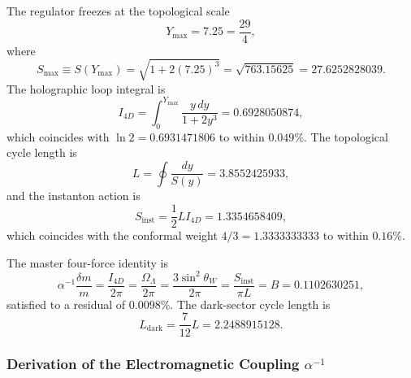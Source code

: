 \documentclass[12pt,oneside,openany]{book}
\begin{document}
The regulator freezes at the topological scale
\begin{equation}
Y_{\max} = 7.25 = \frac{29}{4},
\label{eq:Ymax}
\end{equation}
where
\begin{equation}
S_{\max} \equiv S(Y_{\max}) = \sqrt{1 + 2(7.25)^3} = \sqrt{763.15625} = 27.6252828039.
\label{eq:Smax}
\end{equation}
The holographic loop integral is
\begin{equation}
I_{4D} = \int_0^{Y_{\max}} \frac{y \, dy}{1 + 2y^3} = 0.6928050874,
\label{eq:I4D}
\end{equation}
which coincides with $\ln 2 = 0.6931471806$ to within $0.049\%$. The topological cycle length is
\begin{equation}
L = \oint \frac{dy}{S(y)} = 3.8552425933,
\label{eq:L}
\end{equation}
and the instanton action is
\begin{equation}
S_{\mathrm{inst}} = \frac{1}{2} L I_{4D} = 1.3354658409,
\label{eq:Sinst}
\end{equation}
which coincides with the conformal weight $4/3 = 1.3333333333$ to within $0.16\%$.

The master four-force identity is
\begin{equation}
\boxed{\alpha^{-1}\frac{\delta m}{m} = \frac{I_{4D}}{2\pi} = \frac{\Omega_\Lambda}{2\pi} = \frac{3\sin^2\theta_W}{2\pi} = \frac{S_{\mathrm{inst}}}{\pi L} = B = 0.1102630251,}
\label{eq:master}
\end{equation}
satisfied to a residual of $0.0098\%$. The dark-sector cycle length is
\begin{equation}
L_{\mathrm{dark}} = \frac{7}{12} L = 2.2488915128.
\label{eq:Ldark}
\end{equation}

\subsubsection{Derivation of the Electromagnetic Coupling $\alpha^{-1}$}
\end{document}
